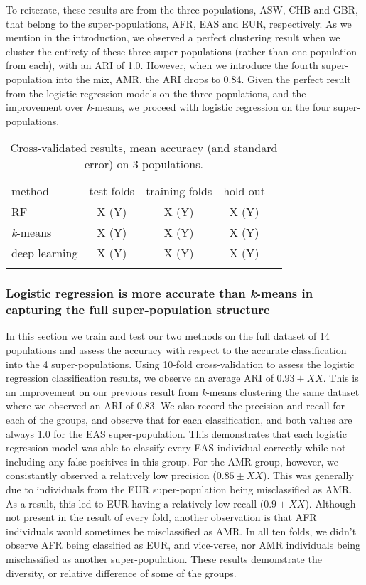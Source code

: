 \documentclass{llncs}
\newcommand{\kMeans}{\textit{k}-means}
\begin{document}
{To reiterate, these results are from the three populations, ASW, CHB and GBR, that belong to the super-populations, AFR, EAS and EUR, respectively.
As we mention in the introduction, we observed a perfect clustering result when we cluster the entirety of these three super-populations (rather than one population from each), with an ARI of 1.0. However, when we introduce the fourth super-population into the mix, AMR, the ARI drops to 0.84.
Given the perfect result from the logistic regression models on the three populations, and the improvement over \kMeans{}, we proceed with logistic regression on the four super-populations.  


\begin{table}
\caption{Cross-validated results, mean accuracy (and standard error) on 3 populations.}
\begin{center}
\renewcommand{\arraystretch}{1.4}
\setlength\tabcolsep{3pt}
\begin{tabular}{lcccc}
\hline\noalign{\smallskip}
method  & test folds & training folds & hold out \\
RF  & X (Y) & X (Y) & X (Y) \\
\kMeans & X (Y) & X (Y) & X (Y) \\
deep learning & X (Y) & X (Y) & X (Y) \\
\noalign{\smallskip}
\hline
\end{tabular}
\end{center}
\end{table}

\subsubsection{Logistic regression is more accurate than \kMeans{} in capturing the full super-population structure}
In this section we train and test our two methods on the full dataset of 14 populations and assess the accuracy with respect to the accurate classification into the 4 super-populations.
Using 10-fold cross-validation to assess the logistic regression classification results, we observe an average ARI of \(0.93 \pm{} XX\). This is an improvement on our previous result from \kMeans{} clustering the same dataset
where we observed an ARI of \(0.83\).
We also record the precision and recall for each of the groups, and observe that for each classification, and both values are always 1.0 for the EAS super-population. This demonstrates that each logistic regression model was able to classify every EAS individual correctly while not including any false positives in this group.
For the AMR group, however, we consistantly observed a relatively low precision (\(0.85\pm{} XX \)). This was generally due to individuals from the EUR super-population being misclassified as AMR. As a result, this led to EUR having a relatively low recall (\(0.9 \pm XX \)).
Although not present in the result of every fold, another observation is that AFR individuals would sometimes be misclassified as AMR. In all ten folds, we didn't observe AFR being classified as EUR, and vice-verse, nor AMR individuals being misclassified as another super-population.
These results demonstrate the diversity, or relative difference of some of the groups. 

}
\end{document}
